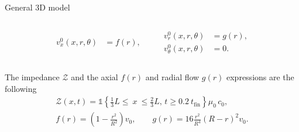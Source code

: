\documentclass[aspectratio=169]{ISAE-Beamer}
\begin{document}
\begin{frame}{General 3D model}
\begin{overlayarea}{\textwidth}{\textheight}
{\begin{columns}[T]
\begin{column}{.45\textwidth}
\begin{equation*}
\begin{aligned}
				v_x^0(x, r, \theta) &= f(r), 
				\end{aligned}  \qquad
				\begin{aligned}
				v_r^0(x, r, \theta) &= g(r), \\
				v_\theta^0(x, r, \theta) &= 0.
				\end{aligned}    
				\end{equation*}
			\end{column}
		\end{columns}
		\vspace{5pt}
		The impedance $\mathcal{Z}$ and the axial $f(r)$ and radial flow $g(r)$ expressions are the following
		\begin{equation*}
		\begin{aligned}
		\mathcal{Z}(x, t) = \mathds{1}\left\{ \frac{1}{3} L \leq \ x \ \leq \frac{2}{3} L, \,  t \geq 0.2 \ t_{\text{fin}} \right\} \mu_0 \, c_0, \\
		f(r) = \left( 1 - \frac{r^2}{R^2} \right) v_0, \qquad
		g(r) = 16 \frac{r^2}{R^4} \left( R - r \right)^2 v_0. 
		\end{aligned}
		\end{equation*}
	}
\end{overlayarea}
\end{frame}
\end{document}
